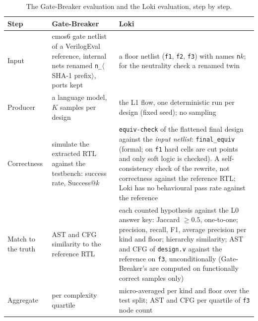 \documentclass[conference]{IEEEtran}
\newcommand{\code}[1]{\texttt{#1}}
\begin{document}
\begin{table}[t]
\caption{The Gate-Breaker evaluation and the Loki evaluation, step by step.}
\label{tab:eval-map}
\centering
\footnotesize
\begin{tabular}{@{}lp{5.6cm}p{9.0cm}@{}}
\toprule
Step & Gate-Breaker & Loki \\
\midrule
Input & cmos6 gate netlist of a VerilogEval reference, internal nets renamed \code{n\_}$\langle$SHA-1 prefix$\rangle$, ports kept &
 a floor netlist (\code{f1}, \code{f2}, \code{f3}) with names \code{n}$k$; for the neutrality
 check a renamed twin \\
Producer & a language model, $K$ samples per design &
 the L1 flow, one deterministic run per design (fixed seed); no sampling \\
Correctness &
 simulate the extracted RTL against the testbench: success rate, Success@$k$ &
 \code{equiv-check} of the flattened final design against the \emph{input netlist}:
 \code{final\_equiv} (formal; on \code{f1} hard cells are cut points and only soft logic is
 checked). A self-consistency check of the rewrite, not correctness against the reference RTL;
 Loki has no behavioural pass rate against the reference \\
Match to the truth &
 AST and CFG similarity to the reference RTL &
 each counted hypothesis against the L0 answer key: Jaccard $\ge 0.5$, one-to-one;
 precision, recall, F1, average precision per kind and floor; hierarchy similarity;
 AST and CFG of \code{design.v} against the reference on \code{f3}, unconditionally (Gate-Breaker's
 are computed on functionally correct samples only) \\
Aggregate & per complexity quartile &
 micro-averaged per kind and floor over the test split; AST and CFG per quartile of \code{f3}
 node count \\
\bottomrule
\end{tabular}
\end{table}
\end{document}
